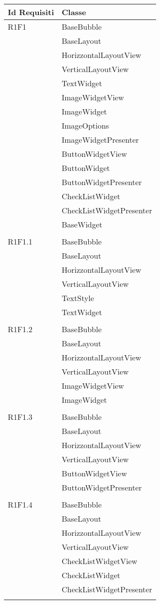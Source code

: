 \begin{center}
	\begin{longtable}{|p{7cm}|p{7cm}|}\hline
		Id Requisiti & Classe \\ \hline
		R1F1 & BaseBubble \\ & BaseLayout \\ & HorizzontalLayoutView \\ & VerticalLayoutView \\ & TextWidget \\ & ImageWidgetView \\ & ImageWidget \\ & ImageOptions \\ & ImageWidgetPresenter \\ & ButtonWidgetView \\ & ButtonWidget \\ & ButtonWidgetPresenter \\ & CheckListWidget \\ & CheckListWidgetPresenter \\ & BaseWidget \\ & \\ \hline
		R1F1.1 & BaseBubble \\ & BaseLayout \\ & HorizzontalLayoutView \\ & VerticalLayoutView \\ & TextStyle \\ & TextWidget \\ & \\ \hline
		R1F1.2 & BaseBubble \\ & BaseLayout \\ & HorizzontalLayoutView \\ & VerticalLayoutView \\ & ImageWidgetView \\ & ImageWidget \\ & \\ \hline
		R1F1.3 & BaseBubble \\ & BaseLayout \\ & HorizzontalLayoutView \\ & VerticalLayoutView \\ & ButtonWidgetView \\ & ButtonWidgetPresenter \\ & \\ \hline
		R1F1.4 & BaseBubble \\ & BaseLayout \\ & HorizzontalLayoutView \\ & VerticalLayoutView \\ & CheckListWidgetView \\ & CheckListWidget \\ & CheckListWidgetPresenter \\ & \\ \hline

\end{longtable}
\end{center}
